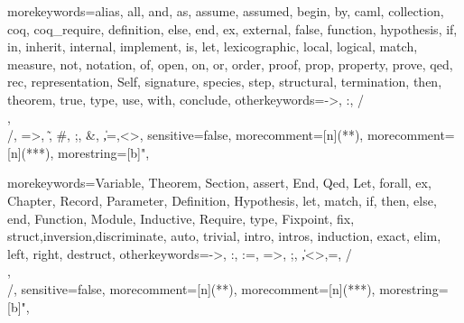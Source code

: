 \usepackage{amsmath}
\usepackage{amsfonts}
\usepackage{listings}
\lstset{basicstyle=\footnotesize\mdseries\itshape\ttfamily,
        frame=single} %
\usepackage{mathpartir}
\usepackage{times}   %
\usepackage{color}
\usepackage{url}

\newcommand{\ocaml}{{\sf OCaml}}
\newcommand{\focal}{{\sf Fo\-Ca\-Li\-ze}}
\newcommand{\focalizec}{{\sf focalizec}}
\newcommand{\zenon}{{\sf Zenon}}
\newcommand{\coq}{{\sf Coq}}

\newcommand{\logand}{\wedge}
\newcommand{\logor}{\vee}

\newcommand{\green}[1]{{\color{green}{#1}}}
\newcommand{\red}[1]{{\color{red}{#1}}}
\newcommand{\blue}[1]{{\color{blue}{#1}}}
\newcommand{\orange}[1]{{\color{orange}{#1}}}
\newcommand{\brown}[1]{{\color{brown}{#1}}}
\newcommand{\magenta}[1]{{\color{magenta}{#1}}}
\newcommand{\cyan}[1]{{\color{cyan}{#1}}}
\newcommand{\darkblue}[1]{{\color{darkblue}{#1}}}

  {morekeywords={alias, all, and, as, assume, assumed, begin, by, caml,
      collection, coq, coq_require, definition, else, end,
      ex, external, false, function, hypothesis, if, in,
      inherit, internal, implement, is, let, lexicographic,
      local, logical, match, measure, not, notation, of, open,
      on, or, order, proof, prop, property, prove, qed, rec,
      representation, Self, signature, species, step,
      structural, termination, then, theorem, true, type, use,
      with, conclude},
    otherkeywords={->, :, /\\, \\/, =>, \~, \#, ;, \&, \|,=,<>},
    sensitive=false,
    morecomment=[n]{(*}{*)},  %
    morecomment=[n]{(**}{*)}, %
    morestring=[b]",
  }

\newcommand{\setlangfocalize}{
\lstset{
  language=FoCaLiZe, tabsize=2, frame=single, breaklines=true,
  basicstyle=\ttfamily, framexleftmargin=1mm, xleftmargin=1mm
}
}
\setlangfocalize

  {morekeywords={Variable, Theorem, Section, assert, End, Qed, Let,
      forall, ex, Chapter, Record, Parameter, Definition, Hypothesis,
      let, match, if, then, else, end, Function, Module, Inductive,
      Require, type, Fixpoint, fix, struct,inversion,discriminate,
      auto, trivial, intro, intros, induction, exact, elim, left,
      right, destruct},
    otherkeywords={->, :, :=, =>, ;, \|,<>,=, /\\, \\/},
    sensitive=false,
    morecomment=[n]{(*}{*)},   %
    morecomment=[n]{(**}{*)},  %
    morestring=[b]",
  }

\newcommand{\setlangcoq}{
\lstset{
  language=MyCoq, tabsize=2, frame=single, breaklines=true,
  basicstyle=\ttfamily, framexleftmargin=1mm, xleftmargin=1mm
}
}
